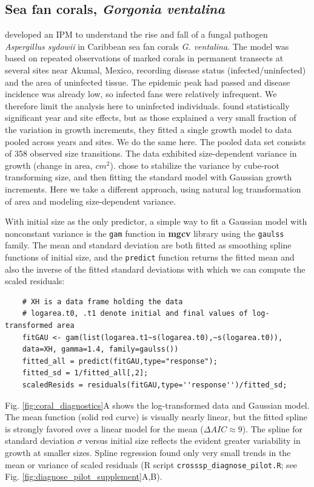 \documentclass[12pt]{article}
\begin{document}
\begin{spacing}{1.35}
\subsection{Sea fan corals, \emph{Gorgonia ventalina}}
\label{sec:seafans}
\cite{bruno-etal-2011} developed an IPM to understand the rise and fall of a fungal pathogen \emph{Aspergillus sydowii} in Caribbean sea fan corals \emph{G. ventalina}. 
The model was based on repeated observations of marked corals in permanent transects at several sites near Akumal, Mexico, recording disease status (infected/uninfected) and the area of uninfected tissue. 
The epidemic peak had passed and disease incidence was already low, so infected fans were relatively infrequent. 
We therefore limit the analysis here to uninfected individuals.
\citet{bruno-etal-2011} found statistically significant year and site effects, but as those explained a very small fraction of the variation in growth increments, they fitted a single growth model to data pooled across years and sites. 
We do the same here. 
The pooled data set consists of 358 observed size transitions. 
The data exhibited size-dependent variance in growth (change in area, $cm^2$).  
\cite{bruno-etal-2011} chose to stabilize the variance by cube-root transforming size, and then fitting the standard model with Gaussian growth increments. 
Here we take a different approach, using natural log transformation of area and modeling size-dependent variance. 

With initial size as the only predictor, a simple way to fit a Gaussian model with nonconstant variance is the \texttt{gam} function in \textbf{mgcv} library \citep{wood-2017} using the \texttt{gaulss} family. 
The mean and standard deviation are both fitted as smoothing spline functions of initial size, and the \texttt{predict} function returns the fitted mean and also the inverse of the fitted standard deviations with which we can compute the scaled residuals: 
\begin{lstlisting}
	# XH is a data frame holding the data
	# logarea.t0, .t1 denote initial and final values of log-transformed area   
	fitGAU <- gam(list(logarea.t1~s(logarea.t0),~s(logarea.t0)),
	data=XH, gamma=1.4, family=gaulss())
	fitted_all = predict(fitGAU,type="response"); 
	fitted_sd = 1/fitted_all[,2]; 
	scaledResids = residuals(fitGAU,type=''response'')/fitted_sd;  
\end{lstlisting}
Fig. \ref{fig:coral_diagnostics}A shows the log-transformed data and Gaussian model. 
The mean function (solid red curve) is visually nearly linear, but the fitted spline is strongly favored over a linear model for the mean ($\Delta AIC \approx 9$). 
The spline for standard deviation $\sigma$ versus initial size reflects the evident greater variability in growth at smaller sizes.  
Spline regression found only very small trends in the mean or variance of scaled residuals (R script \texttt{crosssp\_diagnose\_pilot.R}; see Fig. \ref{fig:diagnose_pilot_supplement}A,B). 


\end{spacing}
\end{document}
